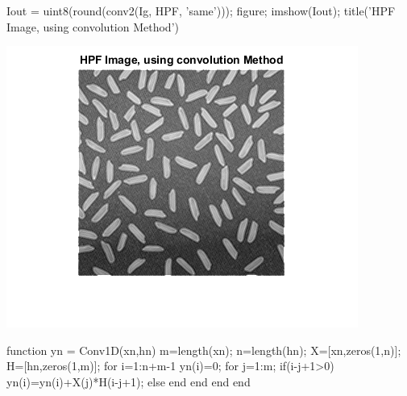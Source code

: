 \documentclass[12pt, onecolumn]{IEEEtran}
\begin{document}
\begin{matlabcode}
Iout = uint8(round(conv2(Ig, HPF, 'same'))); %
figure; imshow(Iout); title('HPF Image, using convolution Method') %
\end{matlabcode}
\begin{center}
\includegraphics[width=\maxwidth{43.753135975915704em}]{figure_18.png}
\end{center}


\vspace{1em}


\vspace{1em}


\begin{matlabcode}
function yn = Conv1D(xn,hn)
m=length(xn);
n=length(hn);
X=[xn,zeros(1,n)];
H=[hn,zeros(1,m)]; 
for i=1:n+m-1
    yn(i)=0;
    for j=1:m;
        if(i-j+1>0)
            yn(i)=yn(i)+X(j)*H(i-j+1);
        else
        end
    end
end
end
\end{matlabcode}
\end{document}
